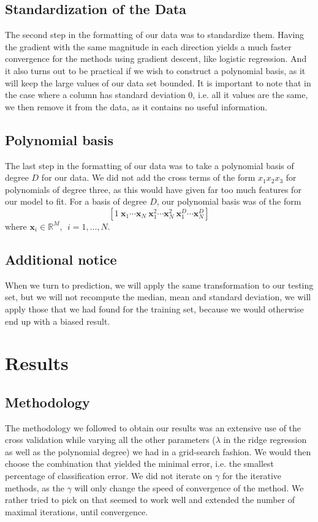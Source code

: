 \documentclass[10pt,conference,compsocconf]{IEEEtran}
\begin{document}
\subsection{Standardization of the Data}
The second step in the formatting of our data was to standardize them. Having the gradient with the same magnitude in each direction yields a much faster convergence for the methods using gradient descent, like logistic regression. And it also turns out to be practical if we wish to construct a polynomial basis, as it will keep the large values of our data set bounded. It is important to note that in the case where a column has standard deviation $0$, i.e. all it values are the same, we then remove it from the data, as it contains no useful information.

\subsection{Polynomial basis}
The last step in the formatting of our data was to take a polynomial basis of degree $D$ for our data. We did not add the cross terms of the form $x_1x_2x_3$ for polynomials of degree three, as this would have given far too much features for our model to fit. For a basis of degree $D$, our polynomial basis was of the form
\begin{equation}
\left[1 ~ \mathbf{x}_1 \cdots \mathbf{x}_N ~\mathbf{x}_1^2 \cdots \mathbf{x}_N^2 ~ \mathbf{x}_1^D \cdots \mathbf{x}_N^D \right]
\end{equation}
where $\mathbf{x}_i \in \mathbb{R}^M, ~~i =1,\ldots,N$. 
\subsection{Additional notice}
When we turn to prediction, we will apply the same transformation to our testing set, but we will not recompute the median, mean and standard deviation, we will apply those that we had found for the training set, because we would otherwise end up with a biased result.
\section{Results}
\subsection{Methodology}
The methodology we followed to obtain our results was an extensive use of the cross validation while varying all the other parameters ($\lambda$ in the ridge regression as well as the polynomial degree) we had in a grid-search fashion. We would then choose the combination that yielded the minimal error, i.e. the smallest percentage of classification error. We did not iterate on $\gamma$ for the iterative methods, as the $\gamma$ will only change the speed of convergence of the method. We rather tried to pick on that seemed to work well and extended the number of maximal iterations, until convergence. 
\end{document}
